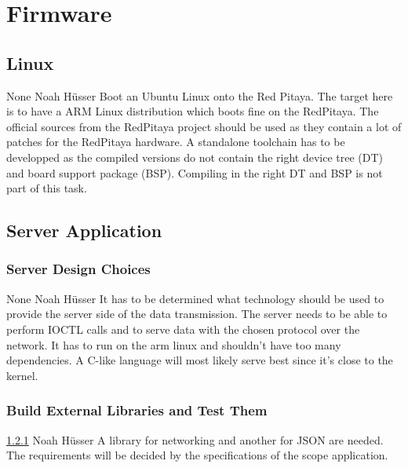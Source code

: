\documentclass[a4paper,oneside]{alpenspecs/alpenspecs}
\begin{document}
\section{Firmware}
\label{sec:firmware}

\subsection{Linux}
\label{subsec:fw:linux}

\wpac
    {}
    {}
    {}
    {None}
    {}
    {Noah H\"usser}
    {%
    Boot an Ubuntu Linux onto the Red Pitaya.%
    The target here is to have a ARM Linux distribution which boots fine on the RedPitaya.
    The official sources from the RedPitaya project should be used as they contain a lot of patches for the RedPitaya hardware.
    A standalone toolchain has to be developped as the compiled versions do not contain the right device tree (DT) and board support package (BSP).
    Compiling in the right DT and BSP is not part of this task.
    }

\subsection{Server Application}
\label{subsec:fw:server}

\subsubsection{Server Design Choices}
\label{subsubsec:fw:server:design-decisions}
\wpac
    {}
    {}
    {}
    {None}
    {}
    {Noah H\"usser}
    {%
        It has to be determined what technology should be used to provide the server side of the data transmission.
        The server needs to be able to perform IOCTL calls and to serve data with the chosen protocol over the network. It has to run on the arm linux and shouldn't have too many dependencies.
        A C-like language will most likely serve best since it's close to the kernel.
    }

\subsubsection{Build External Libraries and Test Them}
\label{subsubsec:fw:server:external}
\wpac
    {}
    {}
    {}
    {\ref{subsubsec:fw:server:design-decisions}}
    {}
    {Noah H\"usser}
    {%
        A library for networking and another for JSON are needed. The requirements will be decided by the specifications of the scope application.
    }
\end{document}
